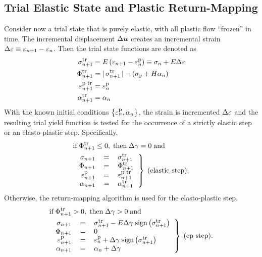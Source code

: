 \subsection{Trial Elastic State and Plastic Return-Mapping}
Consider now a trial state that is purely elastic, 
with all plastic flow ``frozen'' in time. 
The incremental displacement $\Delta \mbox{\boldmath $u$}$ creates an 
incremental strain $\Delta \varepsilon \equiv \varepsilon_{n+1} - \varepsilon_n$.
Then the trial state functions are denoted as
\begin{align}
 \sigma^{\mbox{\footnotesize tr}}_{n+1} & = E \left( \varepsilon_{n+1} - \varepsilon^{\mbox{\footnotesize p}}_{n} \right) \equiv \sigma_n 
 + E \Delta \varepsilon \label{eq:trialStress} \\
 \Phi^{\mbox{\footnotesize tr}}_{n+1} & = | \, \sigma^{\mbox{\footnotesize tr}}_{n+1} \, | - \left(\sigma_y 
 + H \alpha_n \right) \label{eq:trialYieldFunction} \\
 \varepsilon^{\mbox{\footnotesize p tr}}_{n+1} & = \varepsilon^{\mbox{\footnotesize p}}_{n} \\
 \alpha^{\mbox{\footnotesize tr}}_{n+1} & = \alpha_n
\end{align}
With the known initial conditions $\left\{\varepsilon^{\mbox{\footnotesize p}}_{n}, \alpha_n \right\}$,
the strain is incremented $\Delta \varepsilon$ 
and the resulting trial yield function is
tested for the occurrence of a strictly elastic step or an elasto-plastic step.  
Specifically,
\begin{align}
& \mbox{if} \; \Phitrnp \leq 0, \; \mbox{then} \; 
\Delta \gamma = 0 \; \mbox{and} \nonumber \\
& \left.
\begin{tabular}{rcl}
 $\sigmanp$ & $=$ & $\sigmatrnp$ \\
 $\Phinp$ & $=$ & $\Phitrnp$ \\
 $\hstrainpnp$ & $=$ & $\hstrainptrnp$ \\
 $\alphanp$ & $=$ & $\alphatrnp$ 
\end{tabular}
\right\} \; \mbox{(elastic step)}.
\end{align}
Otherwise, the return-mapping algorithm is used for the elasto-plastic step,
\begin{align}
& \mbox{if} \; \Phitrnp > 0, \; \mbox{then} \; 
\Delta \gamma > 0 \; \mbox{and} \nonumber \\
& \left.
\begin{tabular}{rcl}
 $\sigmanp$ & $=$ & $\sigmatrnp - E \Delta \gamma \; 
 \sign\left(\sigmatrnp \right)$ \\
 $\Phinp$ & $=$ & $0$ \\
 $\hstrainpnp$ & $=$ & $\hstrainpn + \Delta \gamma \; 
 \sign\left(\sigmatrnp \right)$ \\
 $\alphanp$ & $=$ & $\alphan + \Delta \gamma$ 
\end{tabular}
\right\} \; \mbox{(ep step)}.
\label{eq:elastoPlasticStep}
\end{align}
